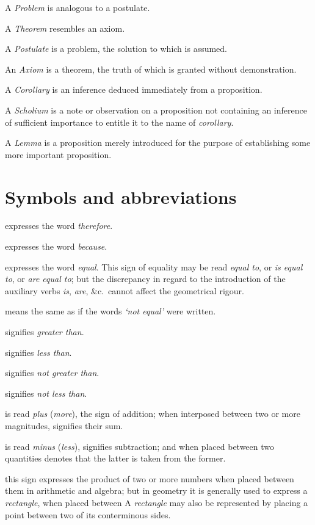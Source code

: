 A \emph{Problem} is analogous to a postulate.

A \emph{Theorem} resembles an axiom.

A \emph{Postulate} is a problem, the solution to which is assumed.

An \emph{Axiom} is a theorem, the truth of which is granted without demonstration.

A \emph{Corollary} is an inference deduced immediately from a proposition.

A \emph{Scholium} is a note or observation on a proposition not containing an inference of sufficient importance to entitle it to the name of \emph{corollary}.

A \emph{Lemma} is a proposition merely introduced for the purpose of establishing some more important proposition.


\chapter*{Symbols and abbreviations}

\symb{$\therefore$}
expresses the word \emph{therefore}.

\symb{$\because$}
 expresses the word \emph{because}.

\symb{$=$}
 expresses the word \emph{equal}. This sign of equality may be read \emph{equal to}, or \emph{is equal to}, or \emph{are equal to}; but the discrepancy in regard to the introduction of the auxiliary verbs \emph{is}, \emph{are}, \&c.\ cannot affect the geometrical rigour.

\symb{$\neq$}
 means the same as if the words \emph{‘not equal’} were written.

\symb{$>$}
 signifies \emph{greater than}.

\symb{$<$}
 signifies \emph{less than}.

\symb{$\ngtr$}
 signifies \emph{not greater than}.

\symb{$\nless$}
 signifies \emph{not less than}.

\symb{$+$}
 is read \emph{plus} (\emph{more}), the sign of addition; when interposed between two or more magnitudes, signifies their sum.

\symb{$-$}
 is read \emph{minus} (\emph{less}), signifies subtraction; and when placed between two quantities denotes that the latter is taken from the former.

\symb{$\times$}
 this sign expresses the product of two or more numbers when placed between them in arithmetic and algebra; but in geometry it is generally used to express a \emph{rectangle}, when placed between  A \emph{rectangle} may also be represented by placing a point between two of its conterminous sides.

